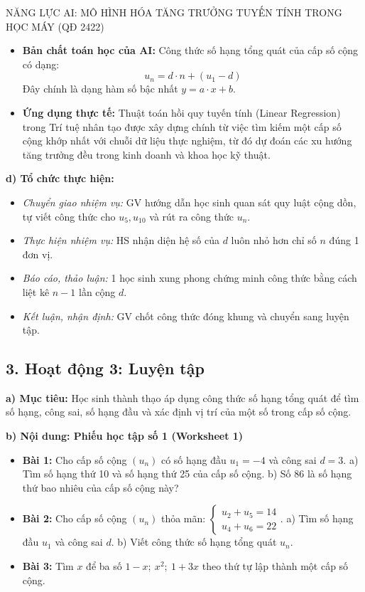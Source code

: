 \documentclass[12pt, a4paper]{article}
\begin{document}
\begin{aibox}{NĂNG LỰC AI: MÔ HÌNH HÓA TĂNG TRƯỞNG TUYẾN TÍNH TRONG HỌC MÁY (QĐ 2422)}  
\begin{itemize}[leftmargin=0.6cm]  
    \item \textbf{Bản chất toán học của AI:} Công thức số hạng tổng quát của cấp số cộng có dạng:  
    $$u_n = d \cdot n + (u_1 - d)$$  
    Đây chính là dạng hàm số bậc nhất $y = a \cdot x + b$.  
    \item \textbf{Ứng dụng thực tế:} Thuật toán hồi quy tuyến tính (Linear Regression) trong Trí tuệ nhân tạo được xây dựng chính từ việc tìm kiếm một cấp số cộng khớp nhất với chuỗi dữ liệu thực nghiệm, từ đó dự đoán các xu hướng tăng trưởng đều trong kinh doanh và khoa học kỹ thuật.  
\end{itemize}  
\end{aibox}  
  
\noindent \textbf{d) Tổ chức thực hiện:}  
\begin{itemize}[leftmargin=0.8cm]  
    \item \textit{Chuyển giao nhiệm vụ:} GV hướng dẫn học sinh quan sát quy luật cộng dồn, tự viết công thức cho $u_5, u_{10}$ và rút ra công thức $u_n$.  
    \item \textit{Thực hiện nhiệm vụ:} HS nhận diện hệ số của $d$ luôn nhỏ hơn chỉ số $n$ đúng 1 đơn vị.  
    \item \textit{Báo cáo, thảo luận:} 1 học sinh xung phong chứng minh công thức bằng cách liệt kê $n-1$ lần cộng $d$.  
    \item \textit{Kết luận, nhận định:} GV chốt công thức đóng khung và chuyển sang luyện tập.  
\end{itemize}  
  
\subsection*{3. Hoạt động 3: Luyện tập}  
  
\noindent \textbf{a) Mục tiêu:}  
Học sinh thành thạo áp dụng công thức số hạng tổng quát để tìm số hạng, công sai, số hạng đầu và xác định vị trí của một số trong cấp số cộng.  
  
\noindent \textbf{b) Nội dung: Phiếu học tập số 1 (Worksheet 1)}  
\begin{itemize}[leftmargin=0.6cm]  
    \item \textbf{Bài 1:} Cho cấp số cộng $(u_n)$ có số hạng đầu $u_1 = -4$ và công sai $d = 3$.  
    a) Tìm số hạng thứ 10 và số hạng thứ 25 của cấp số cộng.  
    b) Số $86$ là số hạng thứ bao nhiêu của cấp số cộng này?  
    \item \textbf{Bài 2:} Cho cấp số cộng $(u_n)$ thỏa mãn: $\begin{cases} u_2 + u_5 = 14 \\ u_4 + u_6 = 22 \end{cases}$.  
    a) Tìm số hạng đầu $u_1$ và công sai $d$.  
    b) Viết công thức số hạng tổng quát $u_n$.  
    \item \textbf{Bài 3:} Tìm $x$ để ba số $1 - x;\ x^2;\ 1 + 3x$ theo thứ tự lập thành một cấp số cộng.  
\end{itemize}  
  
\end{document}
